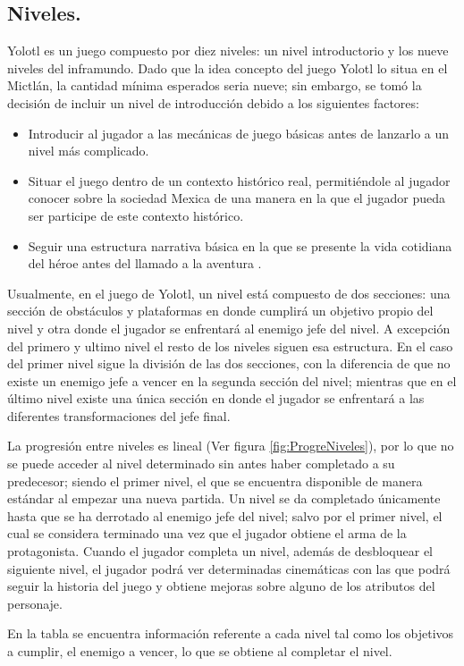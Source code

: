 \subsection{Niveles.} \label{Niveles}
Yolotl es un juego compuesto por diez niveles: un nivel introductorio y los nueve 
niveles del inframundo.  Dado que la idea concepto del juego Yolotl lo situa en 
el Mictlán, la cantidad mínima esperados seria nueve; sin embargo, se tomó la 
decisión de incluir un nivel de introducción debido a los siguientes factores: 

\begin{itemize}
	\item Introducir al jugador a las mecánicas de juego básicas antes de lanzarlo 
	a un nivel más complicado.
	\item Situar el juego dentro de un contexto histórico real, permitiéndole al 
	jugador conocer sobre la sociedad Mexica de una manera en la que el jugador 
	pueda ser participe de este contexto histórico.
	\item Seguir una estructura narrativa básica en la que se presente la vida 
	cotidiana del héroe antes del llamado a la aventura \cite{RefHeroe}.
\end{itemize}

Usualmente, en el juego de Yolotl, un nivel está compuesto de dos secciones: una 
sección de obstáculos y plataformas en donde cumplirá un objetivo propio del nivel 
y otra donde el jugador se enfrentará al enemigo jefe del nivel. A excepción 
del primero y ultimo nivel el resto de los niveles siguen esa estructura. En el 
caso del primer nivel sigue la división de las dos secciones, con la diferencia 
de que no existe un enemigo jefe a vencer en la segunda sección del nivel; 
mientras que en el último nivel existe una única sección en donde el jugador 
se enfrentará a las diferentes transformaciones del jefe final.
\\
\par
La progresión entre niveles es lineal (Ver figura \ref{fig:ProgreNiveles}), 
por lo que no se puede acceder al nivel determinado sin antes haber completado 
a su predecesor; siendo el primer nivel, el que se encuentra disponible de manera 
estándar al empezar una nueva partida. Un nivel se da completado únicamente 
hasta que se ha derrotado al enemigo jefe del nivel; salvo por el primer nivel, 
el cual se considera terminado una vez que el jugador obtiene el arma de la 
protagonista. Cuando el jugador completa un nivel, además de desbloquear el 
siguiente nivel, el jugador podrá ver determinadas cinemáticas con las que podrá 
seguir la historia del juego y obtiene mejoras sobre alguno de los atributos del 
personaje.
\\
\par
En la tabla se encuentra información referente a cada nivel tal como los 
objetivos a cumplir, el enemigo a vencer, lo que se obtiene al completar el nivel.

